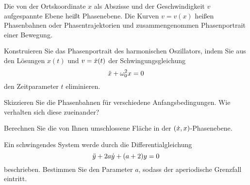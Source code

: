 \begin{atiTask}[
  title = Das Phasenportrait
]
  Die von der Ortskoordinate $x$ als Abszisse und der Geschwindigkeit $v$ aufgespannte Ebene heißt Phasenebene.
  Die Kurven $v=v(x)$ heißen Phasenbahnen oder Phasentrajektorien und zusammengenommen Phasenportrait einer Bewegung.
  \begin{atiSubtasks}
    \item{
      Konstruieren Sie das Phasenportrait des harmonischen Oszillators, indem Sie aus den Lösungen $x(t)$ und $v=\dot{x}(t)$ der Schwingungsgleichung
      \[
        \ddot{x} + \omega_0^2 x = 0
      \]
      den Zeitparameter $t$ eliminieren.
    }
    \item{
      Skizzieren Sie die Phasenbahnen für verschiedene Anfangsbedingungen.
      Wie verhalten sich diese zueinander?
    }
    \item{
      Berechnen Sie die von Ihnen umschlossene Fläche in der $(\dot{x},x)$-Phasenebene.
    }
    \item{
      Ein schwingendes System werde durch die Differentialgleichung
      \[
        \ddot{y} + 2a\dot{y} + (a+2)y=0
      \]
      beschrieben.
      Bestimmen Sie den Parameter $a$, sodass der aperiodische Grenzfall eintritt.
    }
  \end{atiSubtasks}
\end{atiTask}